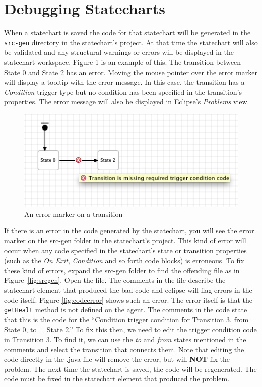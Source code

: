 \documentclass[11pt]{amsart}
\begin{document}
\section{Debugging Statecharts}
When a statechart is saved the code for that statechart will be generated in the \texttt{src-gen} directory in the statechart's project. At that time the statechart will also be validated and any structural warnings or errors will be displayed in the statechart workspace.  Figure \ref{fig:transitionerror} is an example of this. The transition between State 0 and State 2 has an error. Moving the mouse pointer over the error marker will display a tooltip with the error message. In this case, the transition has a \emph{Condition} trigger type but no condition has been specified in the transition's properties. The error message will also be displayed in Eclipse's \emph{Problems} view. 

\begin{figure}
\begin{center}
\vspace{.2in}
\centerline {
\includegraphics[width=5in]{StatechartsImages/transition_error.png}
}
\caption{An error marker on a transition}
\label{fig:transitionerror}
\end{center}
\end{figure}


If there is an error in the code generated by the statechart, you will see the error marker on the src-gen folder in the statechart's project. This kind of error will occur when any code specified in the statechart's state or transition properties (such as the \emph{On Exit}, \emph{Condition} and so forth code blocks) is erroneous. To fix these kind of errors, expand the src-gen folder to find the offending file as in Figure~\ref{fig:srcgen}. Open the file. The comments in the file describe the statechart element that produced the bad code and eclipse will flag errors in the code itself. Figure \ref{fig:codeerror} shows such an error. The error itself is that the \texttt{getHealt} method is not defined on the agent. The comments in the code state that this is the code for the ``Condition trigger condition for Transition 3, from = State 0, to = State 2.'' To fix this then, we need to edit the trigger condition code in Transition 3.  To find it, we  can use the \emph{to} and \emph{from} states mentioned in the comments and select the transition that connects them.  Note that editing the code directly in the .java file will remove the error, but will \textbf{NOT} fix the problem. The next time the statechart is saved, the code will be regenerated. The code must be fixed in the statechart element that produced the problem.
\end{document}
